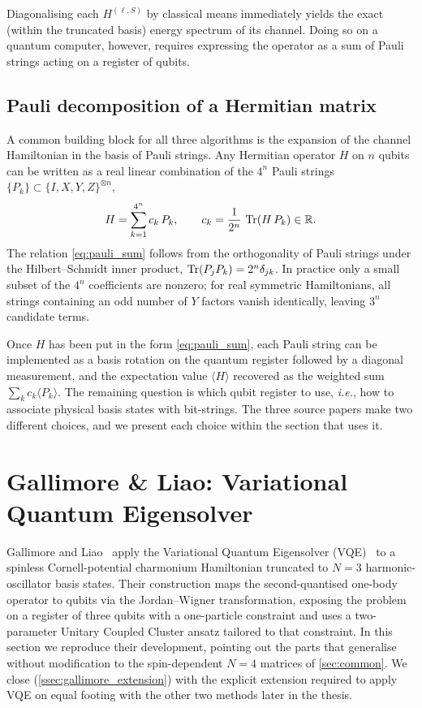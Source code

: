 Diagonalising each $H^{(\ell,S)}$ by classical means immediately yields the
exact (within the truncated basis) energy spectrum of its channel. Doing so on
a quantum computer, however, requires expressing the operator as a sum of
Pauli strings acting on a register of qubits.

\subsection{Pauli decomposition of a Hermitian matrix}
\label{ssec:pauli_decomp}

A common building block for all three algorithms is the expansion of the
channel Hamiltonian in the basis of Pauli strings. Any Hermitian operator
$H$ on $n$ qubits can be written as a real linear combination of the
$4^{n}$ Pauli strings
$\{P_k\} \subset \{I,X,Y,Z\}^{\otimes n}$,
\begin{equation}
  \label{eq:pauli_sum}
  H = \sum_{k=1}^{4^{n}} c_k\,P_k,
  \qquad c_k = \frac{1}{2^{n}}\,\operatorname{Tr}(H\,P_k)\in\mathbb{R}.
\end{equation}
The relation \cref{eq:pauli_sum} follows from the orthogonality of Pauli
strings under the Hilbert--Schmidt inner product,
$\operatorname{Tr}(P_j P_k) = 2^{n}\delta_{jk}$. In practice only a small subset of the
$4^{n}$ coefficients are nonzero; for real symmetric Hamiltonians, all
strings containing an odd number of $Y$ factors vanish identically, leaving
$3^{n}$ candidate terms.

Once $H$ has been put in the form \cref{eq:pauli_sum}, each Pauli string can
be implemented as a basis rotation on the quantum register followed by a
diagonal measurement, and the expectation value $\langle H\rangle$ recovered
as the weighted sum $\sum_k c_k\langle P_k\rangle$. The remaining question
is which qubit register to use, \textit{i.e.}, how to associate physical basis
states with bit-strings. The three source papers make two different
choices, and we present each choice within the section that uses it.


\section{Gallimore \& Liao: Variational Quantum Eigensolver}
\label{sec:gallimore}

Gallimore and Liao~\cite{gallimore2023} apply the Variational Quantum
Eigensolver (VQE)~\cite{peruzzo2014,mcclean2016} to a spinless
Cornell-potential charmonium Hamiltonian truncated to $N=3$
harmonic-oscillator basis states. Their construction maps the
second-quantised one-body operator to qubits via the Jordan--Wigner
transformation, exposing the problem on a register of three qubits with
a one-particle constraint and uses a two-parameter Unitary Coupled
Cluster ansatz tailored to that constraint. In this section we reproduce
their development, pointing out the parts that generalise without
modification to the spin-dependent $N=4$ matrices of \cref{sec:common}.
We close (\cref{ssec:gallimore_extension}) with the explicit extension
required to apply VQE on equal footing with the other two methods later
in the thesis.

